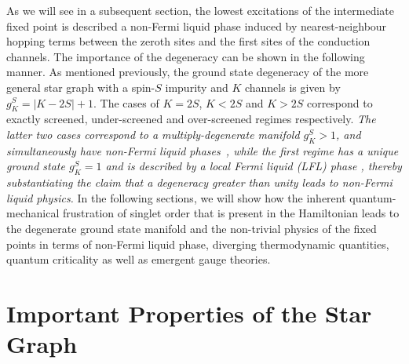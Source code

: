 \documentclass[reprint,prb,superscriptaddress]{revtex4-2}
\begin{document}
As we will see in a subsequent section, the lowest excitations of the intermediate fixed point is described a non-Fermi liquid phase induced by nearest-neighbour hopping terms between the zeroth sites and the first sites of the conduction channels. The importance of the degeneracy can be shown in the following manner. As mentioned previously, the ground state degeneracy of the more general star graph with a spin-\(S\) impurity and \(K\) channels is given by \(g^S_K = |K - 2S|+1\). The cases of \(K=2S\), \(K<2S\) and \(K>2S\) correspond to exactly screened, under-screened and over-screened regimes respectively. \textit{The latter two cases correspond to a multiply-degenerate manifold \(g^S_K > 1\), and simultaneously have non-Fermi liquid phases~\cite{Noz_blandin_1980,Gan_Andrei_Coleman_1993,emery_kivelson,Gan_mchannel_1994,Tsvelick_Weigmann_mchannel_1984,Tsvelick_weigmann_mchannel_1985,parcollet_olivier_large_N,kimura_taro_Su_N_kondo,PhysRevB.73.224445,cox_jarrell_two_channel_rev,affleck_1991_overscreen,Coleman_tsvelik,affleck1993exact,coleman_pepin_2003,roch_nicolas_costi_2009,schiller_avraham_2008,Durganandini_2011}, while the first regime has a unique ground state \(g^S_K = 1\) and is described by a local Fermi liquid (LFL) phase \cite{wilson1975,nozieres1974fermi,Noz_blandin_1980,andreiKondoreview,tsvelickKondoreview}, thereby substantiating the claim that a degeneracy greater than unity leads to non-Fermi liquid physics.} In the following sections, we will show how the inherent quantum-mechanical frustration of singlet order that is present in the Hamiltonian leads to the degenerate ground state manifold and the non-trivial physics of the fixed points in terms of non-Fermi liquid phase, diverging thermodynamic quantities, quantum criticality as well as emergent gauge theories.
\section{Important Properties of the Star Graph}
\end{document}

